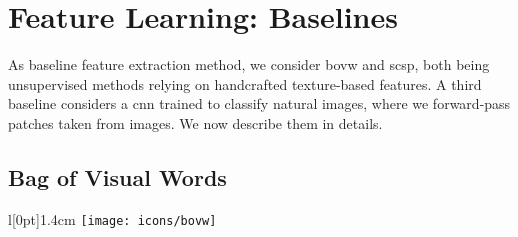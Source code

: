 


\section{Feature Learning: Baselines} \label{ch:baselines}
As baseline feature extraction method, we consider \gls{bovw} and \gls{scsp}, both being unsupervised methods relying on handcrafted texture-based features.
A third baseline considers a \gls{cnn} trained to classify natural images, where we forward-pass patches taken from images.
We now describe them in details.

\subsection{Bag of Visual Words} \label{bow}
\begingroup
\setlength\intextsep{0pt}
\begin{wrapfigure}[4]{l}[0pt]{1.4cm}
\texttt{[image: icons/bovw]}
\end{wrapfigure}

